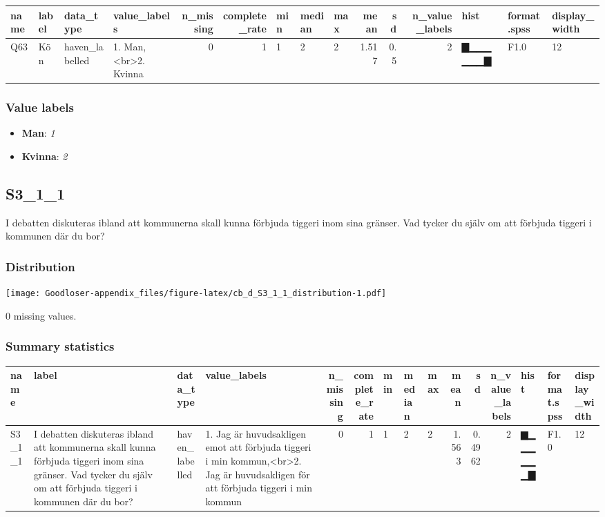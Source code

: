 \documentclass[
]{book}
\providecommand{\tightlist}{%
  \setlength{\itemsep}{0pt}\setlength{\parskip}{0pt}}
\begin{document}
\begin{tabular}{l|l|l|l|r|r|l|l|l|r|r|r|l|l|l}
\hline
name & label & data_type & value_labels & n_missing & complete_rate & min & median & max & mean & sd & n_value_labels & hist & format.spss & display_width\\
\hline
Q63 & Kön & haven_labelled & 1. Man,<br>2. Kvinna & 0 & 1 & 1 & 2 & 2 & 1.517 & 0.5 & 2 & ▇▁▁▁▁▁▁▇ & F1.0 & 12\\
\hline
\end{tabular}

\hypertarget{Q63_labels}{%
\subsubsection{Value labels}\label{Q63_labels}}

\begin{itemize}
\tightlist
\item
  \textbf{Man}: \emph{1}
\item
  \textbf{Kvinna}: \emph{2}
\end{itemize}

\hypertarget{S3_1_1}{%
\subsection{S3\_1\_1}\label{S3_1_1}}

I debatten diskuteras ibland att kommunerna skall kunna förbjuda tiggeri inom sina gränser. Vad tycker du själv om att förbjuda tiggeri i kommunen där du bor?

\hypertarget{S3_1_1_distribution}{%
\subsubsection{Distribution}\label{S3_1_1_distribution}}

\texttt{[image: Goodloser-appendix\_files/figure-latex/cb\_d\_S3\_1\_1\_distribution-1.pdf]}

0 missing values.

\hypertarget{S3_1_1_summary}{%
\subsubsection{Summary statistics}\label{S3_1_1_summary}}

\begin{tabular}{l|l|l|l|r|r|l|l|l|r|r|r|l|l|l}
\hline
name & label & data_type & value_labels & n_missing & complete_rate & min & median & max & mean & sd & n_value_labels & hist & format.spss & display_width\\
\hline
S3_1_1 & I debatten diskuteras ibland att kommunerna skall kunna förbjuda tiggeri inom sina gränser. Vad tycker du själv om att förbjuda tiggeri i kommunen där du bor? & haven_labelled & 1. Jag är huvudsakligen emot att förbjuda tiggeri i min kommun,<br>2. Jag är huvudsakligen för att förbjuda tiggeri i min kommun & 0 & 1 & 1 & 2 & 2 & 1.563 & 0.4962 & 2 & ▆▁▁▁▁▁▁▇ & F1.0 & 12\\
\hline
\end{tabular}
\end{document}
